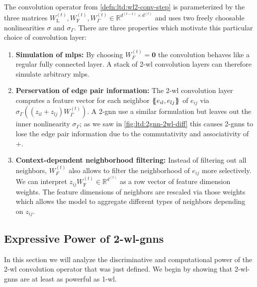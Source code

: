 The convolution operator from \cref{defn:ltd:wl2-conv-step} is parameterized by the three matrices $W_{\mathrm{L}}^{(t)}, W_{\mathrm{F}}^{(t)},  W_{\Gamma}^{(t)} \in \mathbb{R}^{d^{(t-1)} \times d^{(t)}}$ and uses two freely choosable nonlinearities $\sigma$ and $\sigma_{\Gamma}$.
There are three properties which motivate this particular choice of convolution layer:
\begin{enumerate}[label=\textbf{\arabic*.}]
	\item \textbf{Simulation of \acp{mlp}:}
		By choosing $W_{F}^{(t)} = \mathbf{0}$ the convolution behaves like a regular fully connected layer.
		A stack of 2-\acs{wl} convolution layers can therefore simulate arbitrary \acp{mlp}.
	\item \textbf{Perservation of edge pair information:}
		The 2-\acs{wl} convolution layer computes a feature vector for each neighbor $\ldblbrace e_{il}, e_{lj} \rdblbrace$ of $e_{ij}$ via $\sigma_{\Gamma}\left(\left( z_{il} + z_{lj} \right) W_{\Gamma}^{(t)} \right)$.
		A 2-\acs{gnn} use a similar formulation but leaves out the inner nonlinearity $\sigma_{\Gamma}$;
		as we saw in \cref{fig:ltd:2gnn-2wl-diff} this causes 2-\acsp{gnn} to lose the edge pair information due to the commutativity and associativity of $+$.
	\item \textbf{Context-dependent neighborhood filtering:}
		Instead of filtering out all neighbors, $W_{F}^{(t)}$ also allows to filter the neighborhood of $e_{ij}$ more selectively.
		We can interpret $z_{ij} W_{\mathrm{F}}^{(t)} \in \mathbb{R}^{d^{(t)}}$ as a row vector of feature dimension weights.
		The feature dimensions of neighbors are rescaled via those weights which allows the model to aggregate different types of neighbors depending on $z_{ij}$.
\end{enumerate}

\subsection{Expressive Power of 2-\acs*{wl}-\acsp*{gnn}}%
\label{sec:ltd:wl2gnn:properties}

In this section we will analyze the discriminative and computational power of the 2-\ac{wl} convolution operator that was just defined.
We begin by showing that 2-\acs{wl}-\acsp{gnn} are at least as powerful as 1-\acs{wl}.

